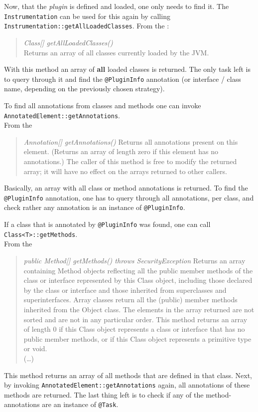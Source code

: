 Now, that the \textit{plugin} is defined and loaded, one only needs to find it.
The \lstinline{Instrumentation} can be used for this again by calling \lstinline{Instrumentation::getAllLoadedClasses}.
From the \textcite{javadoc:instrumentation}:
\begin{quote}
    \textit{Class[] getAllLoadedClasses()}\\
    Returns an array of all classes currently loaded by the JVM.
\end{quote}
With this method an array of \textbf{all} loaded classes is returned.
The only task left is to query through it and find the \lstinline{@PluginInfo} annotation (or interface / class name, depending on the previously chosen strategy).

To find all annotations from classes and methods one can invoke \lstinline{AnnotatedElement::getAnnotations}.\\
From the \textcite{javadoc:annotated_element}
\begin{quote}
    \textit{Annotation[] getAnnotations()}
    Returns all annotations present on this element. (Returns an array of length zero if this element has no annotations.) The caller of this method is free to modify the returned array; it will have no effect on the arrays returned to other callers.
\end{quote}
Basically, an array with all class or method annotations is returned.
To find the \lstinline{@PluginInfo} annotation, one has to query through all annotations, per class, and check rather any annotation is an instance of \lstinline{@PluginInfo}.

If a class that is annotated by \lstinline{@PluginInfo} was found, one can call \lstinline{Class<T>::getMethods}.\\
From the \textcite{javadoc:class}
\begin{quote}
    \textit{public Method[] getMethods() throws SecurityException}
    Returns an array containing Method objects reflecting all the public member methods of the class or interface represented by this Class object, including those declared by the class or interface and those inherited from superclasses and superinterfaces. Array classes return all the (public) member methods inherited from the Object class. The elements in the array returned are not sorted and are not in any particular order. This method returns an array of length 0 if this Class object represents a class or interface that has no public member methods, or if this Class object represents a primitive type or void.\\
    (\dots)
\end{quote}
This method returns an array of all methods that are defined in that class.
Next, by invoking \lstinline{AnnotatedElement::getAnnotations} again, all annotations of these methods are returned.
The last thing left is to check if any of the method-annotations are an instance of \lstinline{@Task}.

